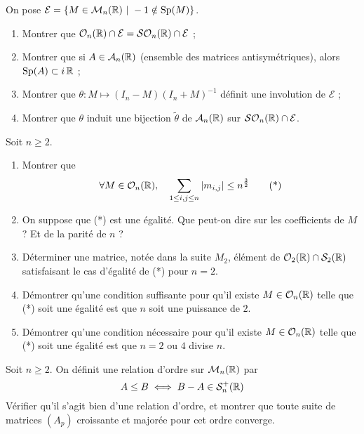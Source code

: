 \begin{exo}
	\label{euclidiens1}
	On pose $\mathcal E=\lbrace M\in\mathcal M_n(\R)\ |\ -1\notin \Sp(M)\rbrace$.
	\begin{enumerate}
		\item Montrer que $\mathcal O_n(\operatorname{\mathbb R})\cap \mathcal E=\mathcal{SO}_n(\operatorname{\mathbb R})\cap \mathcal E$ ;
		\item Montrer que si $A\in\mathcal A_n(\operatorname{\mathbb R})$ (ensemble des matrices antisymétriques), alors $\operatorname{Sp}(A)\subset i\operatorname{\mathbb R}$ ;
		\item Montrer que $\theta : M \mapsto (I_n-M)(I_n+M)^{-1}$ définit une involution de $\mathcal E$ ;
		\item Montrer que $\theta$ induit une bijection $\tilde\theta$ de $\mathcal A_n(\operatorname{\mathbb R})$ sur $\mathcal{SO}_n(\operatorname{\mathbb R})\cap \mathcal E$.
	\end{enumerate}
\end{exo}

\begin{exo}
	\label{euclidiens2}
	Soit $n\geq 2$.
	\begin{enumerate}
		\item Montrer que \[\forall M\in\mathcal O_n(\operatorname{\mathbb R}),\quad \sum_{1\leq i,j\leq n}|m_{i,j}|\leq n^{\frac32}\tag{*}\]
		\item On suppose que (*) est une égalité. Que peut-on dire sur les coefficients de $M$ ? Et de la parité de $n$ ?
		\item Déterminer une matrice, notée dans la suite $M_2$, élément de $\mathcal O_2(\operatorname{\mathbb R})\cap\mathcal S_2(\operatorname{\mathbb R})$ satisfaisant le cas d'égalité de (*) pour $n = 2$.
		\item Démontrer qu'une condition suffisante pour qu'il existe $M\in\mathcal O_n(\operatorname{\mathbb R})$ telle que (*) soit une égalité est que $n$ soit une puissance de $2$.
		\item Démontrer qu'une condition nécessaire pour qu'il existe $M\in\mathcal O_n(\operatorname{\mathbb R})$ telle que (*) soit une égalité est que $n=2$ ou $4$ divise $n$.
	\end{enumerate}
\end{exo}

\begin{exo}
	\label{euclidiens3}
	Soit $n\geq 2$.
	On définit une relation d'ordre sur $\mathcal M_n(\operatorname{\mathbb R})$ par 
	\[
		A\leq B\iff B-A\in\mathcal S_n^+(\operatorname{\mathbb R})	
	\]
	Vérifier qu'il s'agit bien d'une relation d'ordre, et montrer que toute suite de matrices $(A_p)$
	croissante et majorée pour cet ordre converge.
\end{exo}

